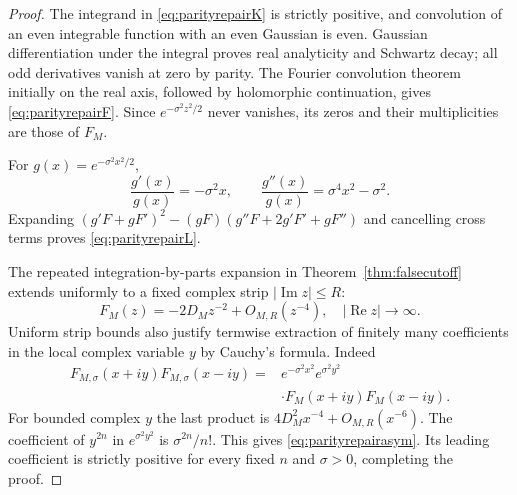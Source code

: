 \begin{proof}
The integrand in \eqref{eq:parityrepairK} is
strictly positive, and convolution of an
even integrable function with an even
Gaussian is even. Gaussian differentiation
under the integral proves real analyticity
and Schwartz decay; all odd derivatives
vanish at zero by parity. The Fourier
convolution theorem initially on the real
axis, followed by holomorphic continuation,
gives \eqref{eq:parityrepairF}. Since
$e^{-\sigma^2z^2/2}$ never vanishes,
its zeros and their multiplicities are
those of $F_M$.

For $g(x)=e^{-\sigma^2x^2/2}$,
\[
\frac{g'(x)}{g(x)}=-\sigma^2x,\qquad
\frac{g''(x)}{g(x)}=\sigma^4x^2-\sigma^2.
\]
Expanding $(g'F+gF')^2-(gF)(g''F+
2g'F'+gF'')$ and cancelling cross terms
proves \eqref{eq:parityrepairL}.

The repeated integration-by-parts
expansion in Theorem~\ref{thm:falsecutoff}
extends uniformly to a fixed complex strip
$|\operatorname{Im}z|\le R$:
\[
F_M(z)=-2D_Mz^{-2}+O_{M,R}(z^{-4}),
\quad |\operatorname{Re}z|\to\infty.
\]
Uniform strip bounds also justify
termwise extraction of finitely many
coefficients in the local complex
variable $y$ by Cauchy's formula.
Indeed
\begin{align*}
F_{M,\sigma}(x+iy)F_{M,\sigma}(x-iy)
={}&e^{-\sigma^2x^2}e^{\sigma^2y^2}\\
&\cdot F_M(x+iy)F_M(x-iy).
\end{align*}
For bounded complex $y$ the last product
is $4D_M^2x^{-4}+O_{M,R}(x^{-6})$.
The coefficient of $y^{2n}$ in
$e^{\sigma^2y^2}$ is $\sigma^{2n}/n!$.
This gives \eqref{eq:parityrepairasym}.
Its leading coefficient is strictly
positive for every fixed $n$ and
$\sigma>0$, completing the proof.
\end{proof}

